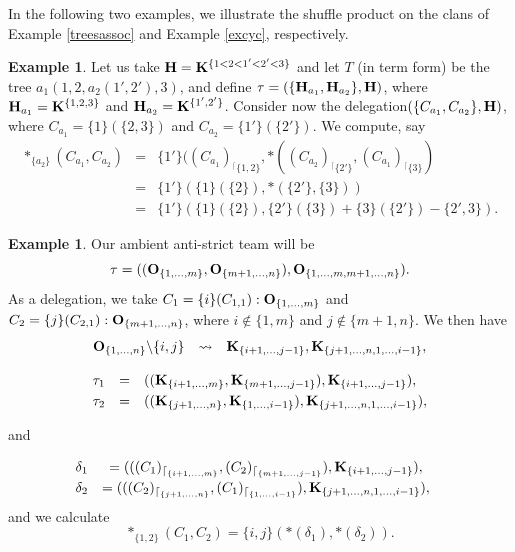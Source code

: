 \documentclass{article}
\theoremstyle{plain}
\theoremstyle{definition}
\newtheorem{example}[thm]{\sc Example}
\newcommand{\set}[1]{\{#1\}}
\newcommand{\hyper}[1]{{\bf #1}}
\newcommand{\restrconstr}[2]{{#1}_{{}^\lceil {#2}}}
\begin{document}
\smallskip
In the following two examples, we illustrate  the shuffle product on the clans of Example \ref{treesassoc} and Example \ref{excyc}, respectively. 
\begin{example} Let us take ${\bf H}={\bf K}^{\set{1<2<1'<2'<3}}$ 
 and let $T$ (in term form) be the tree $a_1(1,2,a_2(1',2'),3)$, and define $\tau=(\set{{\bf H}_{a_1}, {\bf H}_{a_2}},{\bf H})$, where
 ${\bf H}_{a_1}={\bf K}^{\set{1,2,3}}$ and ${\bf H}_{a_2}={\bf K}^{\set{1',2'}}$. 
 Consider now the delegation$(\set{C_{a_1},C_{a_2}},\hyper{H})$, where 
$C_{a_1}=\set{1}(\set{2,3})$ and $C_{a_2}= \set{1'}(\set{2'})$. We compute, say
$$\begin{array}{lll}
\ast_{\set{a_2}}(C_{a_1},C_{a_2}) & = &\set{1'}(\restrconstr{(C_{a_1})}{\set{1,2}},\ast(\restrconstr{(C_{a_2})}{\set{2'}},\restrconstr{(C_{a_1})}{\set{3}})\\
& = & \set{1'}(\set{1}(\set{2}),\ast(\set{2'},\set{3}))\\
& = & \set{1'}(\set{1}(\set{2}), \set{2'}(\set{3})+\set{3}(\set{2'})-\{2',3\}).
\end{array}$$

 

\end{example}
\begin{example} Our ambient anti-strict team will be
$$\tau=(({\bf O}_{\{1,\dots,m\}},{\bf O}_{\{m+1,\dots,n\}}),{\bf O}_{\{1,\dots,m,m+1,\dots,n\}}).$$ As a delegation, we take $C_1=\{i\}(C_{1,1}):{\bf O}_{\{1,\dots,m\}}$ and $C_2=\{j\}(C_{2,1}):{\bf O}_{\{m+1,\dots,n\}}$, where $i\notin\{1,m\}$ and $j\not\in\{m+1,n\}$. We then have
$$\begin{array}{rcl}
{\bf O}_{\{1,\dots,n\}}\backslash\{i,j\} &\leadsto &   {\bf K}_{\{i+1,\dots,j-1\}},  {\bf K}_{\{j+1,\dots,n,1,\dots,i-1\}},
\end{array}$$

$$\begin{array}{rcl}
\tau_1&=&(({\bf K}_{\{i+1,\dots,m\}},{\bf K}_{\{m+1,\dots,j-1\}}),{\bf K}_{\{i+1,\dots,j-1\}}),  \\[0.1cm]
\tau_2&=&(({\bf K}_{\{j+1,\dots,n\}},  {\bf K}_{\{1,\dots,i-1\}}),{\bf K}_{\{j+1,\dots,n,1,\dots,i-1\}}),\end{array}$$ 

and

$$\begin{array}{rcl}
\delta_1&=((({C_1})_{\lceil_{\{i+1,\dots,m\}}},({C_2})_{\lceil_{\{m+1,\dots,j-1\}}}),{\bf K}_{\{i+1,\dots,j-1\}}),&\\[0.1cm]
\delta_2&=((({C_2})_{\lceil_{\{j+1,\dots,n\}}}, ({C_{1}})_{\lceil_{\{1,\dots,i-1\}}}),{\bf K}_{\{j+1,\dots,n,1,\dots,i-1\}}),&\end{array}$$ 
and we calculate
$$\ast_{\{1,2\}}(C_1,C_2)=\{i,j\}(\ast(\delta_1),\ast(\delta_2)).$$
 
\end{example}
\end{document}
